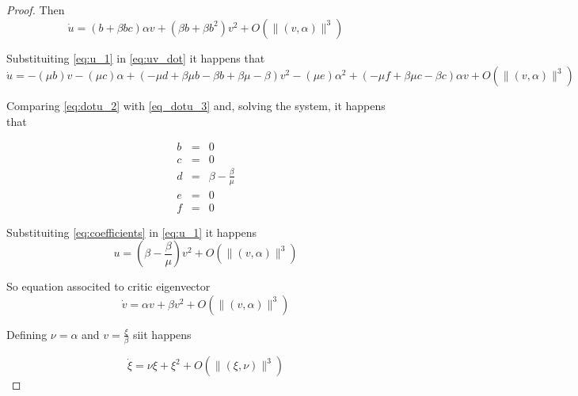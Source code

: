 \begin{proof}
Then 
\begin{equation}
    \label{eq:dotu_2}
    \dot{u} = (b+\beta bc)\alpha v + (\beta b + \beta b^2) v^2 + O\left(\|(v,\alpha)\|^3\right)
\end{equation}

Substituiting \ref{eq:u_1} in \ref{eq:uv_dot} it happens that
\begin{equation}
    \label{eq_dotu_3}
    \dot{u} = -(\mu b)v -(\mu c)\alpha +(-\mu d + \beta\mu b -\beta b+\beta\mu-\beta)v^2-(\mu e)\alpha^2+(-\mu f+\beta\mu c -\beta c)\alpha v+O\left(\|(v,\alpha)\|^3\right)
\end{equation}

Comparing \ref{eq:dotu_2} with \ref{eq_dotu_3} and, solving the system, it happens that

\begin{equation}
    \label{eq:coefficients}
    \begin{array}{ccc}
        b &=& 0 \\
        c &=& 0 \\
        d &=& \beta-\frac{\beta}{\mu} \\
        e &=& 0 \\
        f &=& 0
    \end{array}
\end{equation}

Substituiting \ref{eq:coefficients} in \ref{eq:u_1} it happens
\begin{equation}
    u = \left(\beta - \frac{\beta}{\mu}\right) v^2 + O\left(\|(v,\alpha)\|^3\right)
\end{equation}

So equation associted to critic eigenvector
\begin{equation}
    \dot{v} = \alpha v + \beta v^2 + O\left(\|(v,\alpha)\|^3\right)
\end{equation}

Defining $\nu = \alpha$ and $v = \frac{\xi}{\beta}$ siit happens

\begin{equation}
    \dot{\xi} = \nu\xi + \xi^2 + O\left(\|(\xi,\nu)\|^3\right)
\end{equation}
\end{proof}